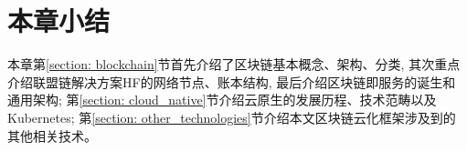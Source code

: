 





\section{本章小结}

本章第\ref{section: blockchain}节首先介绍了区块链基本概念、架构、分类, 其次重点介绍联盟链解决方案HF的网络节点、账本结构, 最后介绍区块链即服务的诞生和通用架构; 第\ref{section: cloud_native}节介绍云原生的发展历程、技术范畴以及Kubernetes; 第\ref{section: other_technologies}节介绍本文区块链云化框架涉及到的其他相关技术。






